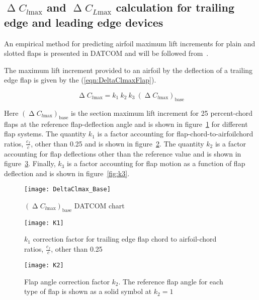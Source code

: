\subsection{$\upDelta C_{l\text{max}}$ and  $\upDelta C_{L\text{max}}$ calculation for trailing edge and leading edge devices}
An empirical method for predicting airfoil maximum lift increments for plain and slotted flaps is presented in DATCOM and will be followed from~\cite{sforza2014commercial}.

The maximum lift increment provided to an airfoil by the deflection of a trailing edge flap is given by the (\ref{eqn:DeltaClmaxFlap}).

\begin{equation}
\upDelta C_{l\text{max}}=k_1\ k_2\ k_3\ \left(\upDelta C_{l\text{max}}\right)_{\text{base}}
\label{eqn:DeltaClmaxFlap}
\end{equation}

\noindent
Here $\left(\upDelta C_{l\text{max}}\right)_{\text{base}}$ is the section maximum lift increment for 25 percent-chord flaps at the reference flap-deflection angle and is shown in figure~\ref{fig:DeltaClmaxBase} for different flap systems. The quantity $k_1$ is a factor accounting for flap-chord-to-airfoilchord ratios, $\frac{c_{f}}{c}$, other than 0.25 and is shown in figure~\ref{fig:k1}. The quantity $k_2$ is a factor accounting for flap deflections other than the reference value and is shown in figure~\ref{fig:k2}. Finally, $k_3$ is a factor accounting for flap motion as a function of flap deflection and is shown in figure~\ref{fig:k3}.

\begin{figure}[!b]
  \centering
  \texttt{[image: DeltaClmax\_Base]}
  \caption{$\left(\upDelta C_{l\text{max}}\right)_{\text{base}}$ DATCOM chart}
  \label{fig:DeltaClmaxBase}
\end{figure}

\begin{figure}[H]
  \centering
  \texttt{[image: K1]}
  \caption{$k_1$ correction factor for trailing edge flap chord to airfoil-chord ratios, $\frac{c_{f}}{c}$, other than 0.25}
  \label{fig:k1}
\end{figure}

\begin{figure}[H]
  \centering
  \texttt{[image: K2]}
  \caption{Flap angle correction factor $k_2$. The reference flap angle for each type of flap is shown as a solid symbol at $k_2=1$}
  \label{fig:k2}
\end{figure}

